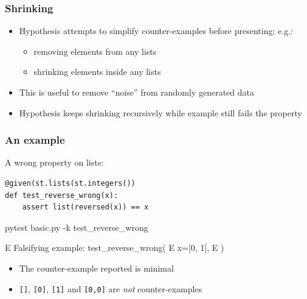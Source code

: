 \documentclass{beamer}
\begin{document}
\begin{frame}
  \frametitle{Shrinking}

  \begin{itemize}
  \item Hypothesis attempts to \alert{simplify counter-examples}
    before presenting; e.g.:
  \begin{itemize}
  \item removing elements from any lists
  \item shrinking elements inside any lists
  \end{itemize}
\item This is useful to remove ``noise'' from
  randomly generated data
\item Hypothesis keeps shrinking recursively while example still fails
  the property
\end{itemize}
\end{frame}

\begin{frame}[fragile]
  \frametitle{An example}

  A wrong property on lists: 
\begin{verbatim}
@given(st.lists(st.integers())
def test_reverse_wrong(x):
    assert list(reversed(x)) == x
\end{verbatim}
\medskip
\pause
  
\begin{semiverbatim}
pytest basic.py -k test_reverse_wrong

\alert{E       Falsifying example: test_reverse_wrong(}
\alert{E           x=[0, 1],}
\alert{E       )}
\end{semiverbatim}

\pause

\begin{itemize}
\item The counter-example reported is \alert{minimal}
\item \texttt{[]}, \texttt{[0]}, \texttt{[1]} and
  \texttt{[0,0]}
  are \emph{not} counter-examples
  
\end{itemize}

\end{frame}
\end{document}

